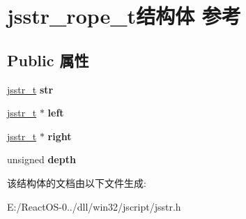 \hypertarget{structjsstr__rope__t}{}\section{jsstr\+\_\+rope\+\_\+t结构体 参考}
\label{structjsstr__rope__t}
\subsection*{Public 属性}
\begin{DoxyCompactItemize}
\item 
\mbox{\label{structjsstr__rope__t_a1650ecffc371a40cda67741be5b2932f}} 
\hyperlink{struct__jsstr__t}{jsstr\+\_\+t} {\bfseries str}
\item 
\mbox{\label{structjsstr__rope__t_a0ff839a723ae166c333d0720d29c819e}} 
\hyperlink{struct__jsstr__t}{jsstr\+\_\+t} $\ast$ {\bfseries left}
\item 
\mbox{\label{structjsstr__rope__t_a180b33a2c63e4da78ef0a4b6d876e673}} 
\hyperlink{struct__jsstr__t}{jsstr\+\_\+t} $\ast$ {\bfseries right}
\item 
\mbox{\label{structjsstr__rope__t_ab37d04ff3d0df733e451661b439d735b}} 
unsigned {\bfseries depth}
\end{DoxyCompactItemize}


该结构体的文档由以下文件生成\+:\begin{DoxyCompactItemize}
\item 
E\+:/\+React\+O\+S-\/0../dll/win32/jscript/jsstr.\+h\end{DoxyCompactItemize}
